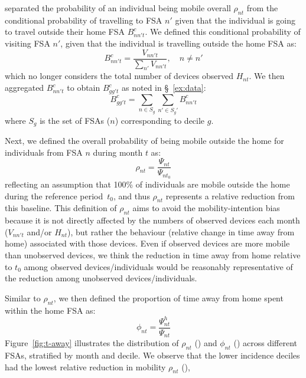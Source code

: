 separated the probability of an individual being mobile overall $\rho_{nt}$ from
the conditional probability of travelling to FSA $n'$
given that the individual is going to travel outside their home FSA $B^c_{nn't}$.
We defined this conditional probability of visiting FSA $n'$,
given that the individual is travelling outside the home FSA as:
\begin{equation}
  B^c_{nn't} = \frac{V_{nn't}}{\sum_{n'} V_{nn't}},\quad n \ne n'
\end{equation}
which no longer considers the total number of devices observed $H_{nt}$.
We then aggregated $B^c_{nn't}$ to obtain $B^c_{gg't}$
as noted in \S~\ref{ex:data}:
\begin{equation}\label{eq:Bgg.app}
  B^c_{gg't} = \sum_{n \in S_g}\sum_{n' \in S_g'} B^c_{nn't}
\end{equation}
where $S_g$ is the set of FSAs ($n$) corresponding to decile $g$.
\par
Next, we defined the overall probability of being mobile outside the home
for individuals from FSA $n$ during month $t$ as:
\begin{equation}
  \rho_{nt} = \frac{\Psi_{nt}}{\Psi_{nt_0}}
\end{equation}
reflecting an assumption that
100\% of individuals are mobile outside the home during the reference period~$t_0$,
and thus $\rho_{nt}$ represents a relative reduction from this baseline.
This definition of $\rho_{nt}$ aims to avoid the mobility-intention bias
because it is not directly affected by the numbers of observed devices each month
($V_{nn't}$ and/or $H_{nt}$), but rather
the behaviour (relative change in time away from home) associated with those devices.
Even if observed devices are more mobile than unobserved devices,
we think the reduction in time away from home relative to $t_0$
among observed devices/individuals
would be reasonably representative of the reduction
among unobserved devices/individuals.
\par
Similar to $\rho_{nt}$, we then defined
the proportion of time away from home spent within the home FSA as:
\begin{equation}
  \phi_{nt} = \frac{\Psi^h_{nt}}{\Psi_{nt}}
\end{equation}
Figure~\ref{fig:t-away} illustrates the distribution of
$\rho_{nt}$ () and
$\phi_{nt}$ ()
across different FSAs, stratified by month and decile.
We observe that the lower incidence deciles had
the lowest relative reduction in mobility $\rho_{nt}$ (),
